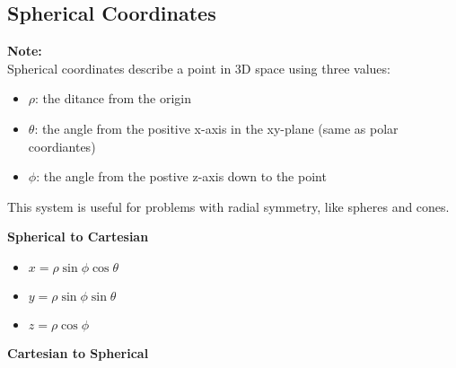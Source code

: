 \documentclass[10pt]{article}                               %
\begin{document}
\begin{defaultbox}
\begin{adjustwidth}{2em}{0pt}
\begin{adjustwidth}{2em}{0pt}
\begin{examplebox}
            \end{examplebox}

        \end{adjustwidth}


        \subsection*{Spherical Coordinates}

        \begin{adjustwidth}{2em}{0pt}

            \begin{notebox}

                \textbf{Note:} \\
                Spherical coordinates describe a point in 3D space using three values:
                        
                \begin{itemize}
                    \item \( \rho \): the ditance from the origin
                    \item \( \theta \): the angle from the positive x-axis in the xy-plane (same as polar coordiantes)
                    \item \( \phi \): the angle from the postive z-axis down to the point
                \end{itemize}

                This system is useful for problems with radial symmetry, like spheres and cones.

            \end{notebox}

            \vspace{0.5em}

            \textbf{Spherical to Cartesian}

                \begin{itemize}
                    \item \( x = \rho\sin\phi\cos\theta \)
                    \item \( y = \rho\sin\phi\sin\theta \)
                    \item \( z = \rho\cos\phi \)
                \end{itemize}

                \vspace{0.5em}

                \textbf{Cartesian to Spherical}


\end{adjustwidth}
\end{adjustwidth}
\end{defaultbox}
\end{document}
